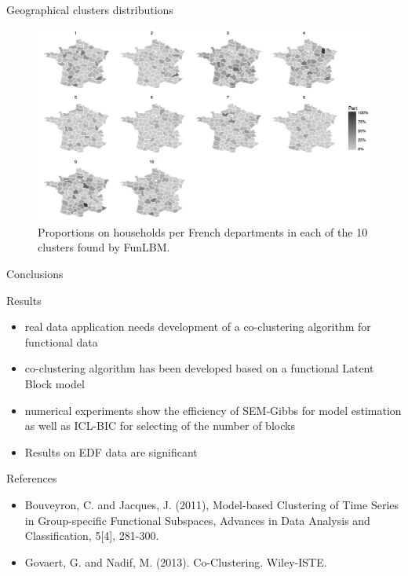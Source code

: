 \documentclass[10pt]{beamer}
\def\relief#1{{\color{blue} {#1}}}
\begin{document}
\begin{frame}{Geographical clusters distributions}
\begin{figure}
\begin{centering}
\includegraphics[width=0.9\columnwidth]{images/graph-cartes.png}
\par\end{centering}
\caption{Proportions on households per French departments in each of the 10 clusters found by FunLBM.}
\label{fig:EDF-ICL}
\end{figure}
\end{frame}

\begin{frame}{Conclusions}
\begin{block}{Results}
\begin{itemize}
\item \relief{real data} application needs development of a \relief{co-clustering algorithm for functional data}
\item co-clustering algorithm has been developed based on a \relief{functional Latent Block model}
\item numerical experiments show the \relief{efficiency of SEM-Gibbs} for model estimation as well as \relief{ICL-BIC}  for selecting of the number of blocks
\item Results on EDF data are significant
\end{itemize}
\end{block}
\begin{block}{References}
\begin{itemize}
\item Bouveyron, C. and Jacques, J. (2011), Model-based Clustering of Time Series in Group-specific Functional Subspaces, Advances in Data Analysis and Classification, 5[4], 281-300.
\item  Govaert, G. and Nadif, M. (2013). Co-Clustering. Wiley-ISTE.
\end{itemize}
\end{block}
\end{frame}
\end{document}
